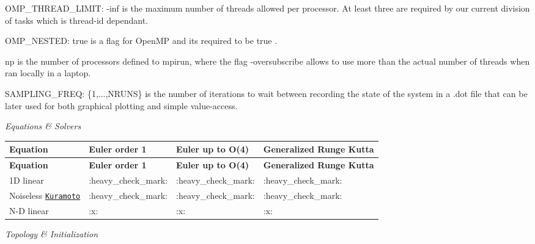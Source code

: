 \begin{DoxyItemize}
\item O\+M\+P\+\_\+\+T\+H\+R\+E\+A\+D\+\_\+\+L\+I\+M\+IT\+: {-\/inf} is the maximum number of threads allowed per processor. At least three are required by our current division of tasks which is thread-\/id dependant.
\item O\+M\+P\+\_\+\+N\+E\+S\+T\+ED\+: {\ttfamily true} is a flag for Open\+MP and it\textquotesingle{}s required to be {\ttfamily true} .
\item np is the number of processors defined to mpirun, where the flag {\ttfamily -\/oversubscribe} allows to use more than the actual number of threads when ran locally in a laptop.
\item S\+A\+M\+P\+L\+I\+N\+G\+\_\+\+F\+R\+EQ\+: {\ttfamily \{1,...,N\+R\+U\+NS\}} is the number of iterations to wait between recording the state of the system in a .dot file that can be later used for both graphical plotting and simple value-\/access.
\end{DoxyItemize}

\begin{center}{\itshape Equations \& Solvers}\end{center} 

\tabulinesep=1mm
\begin{longtabu} spread 0pt [c]{*{4}{|X[-1]}|}
\hline
\rowcolor{\tableheadbgcolor}\textbf{ Equation }&\textbf{ Euler order 1 }&\textbf{ Euler up to O(4) }&\textbf{ Generalized Runge Kutta  }\\
\endfirsthead
\hline
\endfoot
\hline
\rowcolor{\tableheadbgcolor}\textbf{ Equation }&\textbf{ Euler order 1 }&\textbf{ Euler up to O(4) }&\textbf{ Generalized Runge Kutta  }\\
\endhead
1D linear &\+:heavy\+\_\+check\+\_\+mark\+: &\+:heavy\+\_\+check\+\_\+mark\+: &\+:heavy\+\_\+check\+\_\+mark\+: \\
Noiseless \href{https://en.wikipedia.org/wiki/Kuramoto_model}{\tt Kuramoto} &\+:heavy\+\_\+check\+\_\+mark\+: &\+:heavy\+\_\+check\+\_\+mark\+: &\+:heavy\+\_\+check\+\_\+mark\+: \\
N-\/D linear &\+:x\+: &\+:x\+: &\+:x\+: \\
\end{longtabu}
\begin{center}{\itshape Topology \& Initialization}\end{center} 

